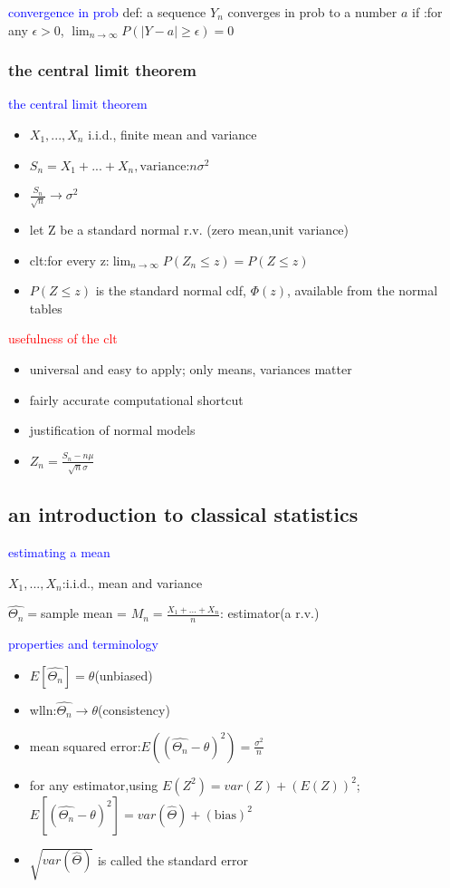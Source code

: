 \textcolor{blue}{convergence in prob}
def: a sequence $Y_n$ converges in prob to a number $a$ if :for any $\epsilon>0$, $\lim_{n\to \infty}P(|Y-a|\ge \epsilon)=0$





\subsubsection*{the central limit theorem}

\textcolor{blue}{the central limit theorem}
\begin{itemize}
    \item $X_1,...,X_n$ i.i.d., finite mean and variance
    \item $S_n=X_1+...+X_n,\text{variance:}n\sigma^2$
    \item $\frac{S_n}{\sqrt{n}}\to \sigma^2$
    \item let Z be a standard normal r.v. (zero mean,unit variance)
    \item clt:for every z:$\lim_{n\to \infty}P(Z_n\le z)=P(Z\le z)$
    \item $P(Z\le z)$ is the standard normal cdf, $\Phi(z)$, available from the normal tables 
\end{itemize}

\textcolor{red}{usefulness of the clt}
\begin{itemize}
    \item universal and easy to apply; only means, variances matter
    \item fairly accurate computational shortcut
    \item justification of normal models
    \item $Z_n=\frac{S_n-n\mu}{\sqrt{n}\sigma}$
\end{itemize}





\subsection*{an introduction to classical statistics}

\textcolor{blue}{estimating a mean}

$X_1,...,X_n$:i.i.d., mean and variance

$\hat{\Theta_n}=$sample mean = $M_n=\frac{X_1+...+X_n}{n}$: estimator(a r.v.)


\textcolor{blue}{properties and terminology}
\begin{itemize}
    \item $E[\hat{\Theta_n}]=\theta$(unbiased)
    \item wlln:$\hat{\Theta_n}\to \theta$(consistency)
    \item mean squared error:$E((\hat{\Theta_n}-\theta)^2)=\frac{\sigma^2}{n}$
    \item for any estimator,using $E(Z^2)=var(Z)+(E(Z))^2$;$E[(\hat{\Theta_n}-\theta)^2]=var(\hat{\Theta})+(\text{bias})^2$
    \item $\sqrt{var(\hat{\Theta})}$ is called the standard error
\end{itemize}

